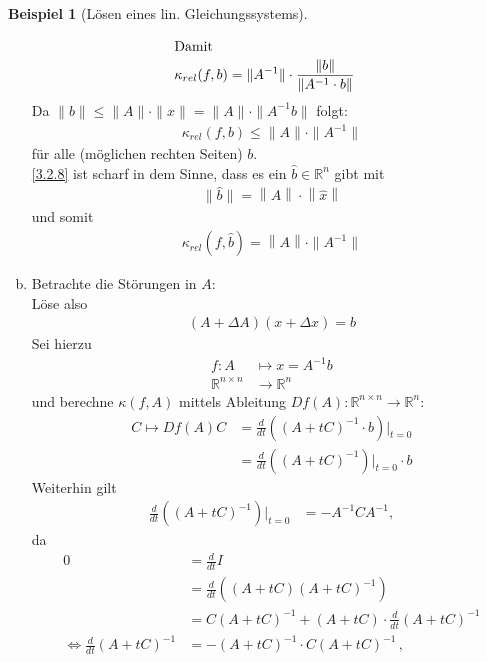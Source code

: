 \documentclass[ngerman,fontsize=11pt, paper=a4, parskip=half, titlepage=true, toc=bib]{scrbook}
\theoremstyle{definition}
\newtheorem{Bsp}[Def]{Beispiel}
\theoremstyle{plain}
\newcommand{\R}{\mathds{R}}
\newcommand{\nn}[1]{\left\| #1 \right\|}
\newenvironment{Bspe}[1][]{ %
  \begin{Bsp}[#1]
  }
  {
  \end{Bsp}
  \addtocounter{subsection}{1}
}
\begin{document}
\begin{Bspe}[Lösen eines lin. Gleichungssystems]
\begin{enumerate}[a)]
\begin{align}
      \intertext{Damit}
      \kappa_{rel} (f,b) &= \|A^{-1} \| \cdot \frac{\|b\|}{\|A^{-1}\cdot b\|} \label{III.2.7}
    \end{align}
    Da $\|b\| \leq \|A\|\cdot\|x\| = \|A\|\cdot \|A^{-1}b\|$ folgt:
    \begin{gather}
      \kappa_{rel}(f,b) \leq \|A\| \cdot \|A^{-1}\| \label{III.2.8}
    \end{gather}
    für alle (möglichen rechten Seiten) $b $.\\
    \ref{3.2.8} ist scharf in dem Sinne, dass es ein $\widehat{b}\in \R^n$ gibt 
    mit 
    \begin{gather*}
      \|\widehat{b}\| = \nn{A}\cdot \nn{\widehat{x}}
    \end{gather*}
    und somit
    \begin{gather*}
      \kappa_{rel}(f,\widehat{b}) = \nn{A}\cdot \| A^{-1}\|
    \end{gather*} %
  \item Betrachte die Störungen in $A$:\\
    Löse also 
    \begin{gather*}
      (A+\Delta A)(x+\Delta x) = b
    \end{gather*}
    Sei hierzu
    \begin{align*}
      f:A&\mapsto x= A^{-1}b \\
      \R^{n\times n}&\rightarrow \R^n
    \end{align*}
    und berechne $\kappa(f,A)$ mittels Ableitung $Df(A):\R^{n\times n} \rightarrow \R^n$:
    \begin{align*}
      C\mapsto Df(A) C&= \frac{d}{dt} \left((A+tC)^{-1} \cdot b\right) \Big\vert_{t=0} \\
                      & = \frac{d}{dt}\left((A+tC)^{-1}\right)\Big\vert_{t=0}\cdot b
    \end{align*}			
    Weiterhin gilt
    \begin{align}
      \frac{d}{dt} \left((A+tC)^{-1}\right) \Big\vert_{t=0} 
      &=-A^{-1}CA^{-1}, 
        \label{III.2.9}
    \end{align}
    da
    \begin{align*}
      0&= \frac{d}{dt}I \\
       &= \frac{d}{dt}\left( (A+tC)(A+tC)^{-1}\right)\\
       &= C(A+tC)^{-1} +(A+tC)\cdot \frac{d}{dt}(A+tC)^{-1} \\
      \Leftrightarrow \frac{d}{dt} (A+ tC)^{-1} 
       &= -(A+tC)^{-1} \cdot C(A+tC)^{-1} \, ,

\end{align*}
\end{enumerate}
\end{Bspe}
\end{document}

